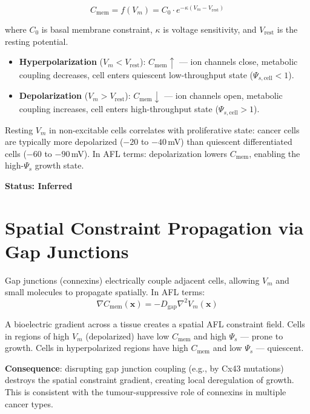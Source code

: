 \documentclass[12pt,a4paper]{article}
\begin{document}
\begin{equation}
    C_{\mathrm{mem}} = f(V_m) = C_0 \cdot e^{-\kappa (V_m - V_{\mathrm{rest}})}
\end{equation}

where $C_0$ is basal membrane constraint, $\kappa$ is voltage sensitivity, and $V_{\mathrm{rest}}$ is the resting potential.

\begin{itemize}
    \item \textbf{Hyperpolarization} ($V_m < V_{\mathrm{rest}}$): $C_{\mathrm{mem}} \uparrow$ --- ion channels close, metabolic coupling decreases, cell enters quiescent low-throughput state ($\Psi_{s,\mathrm{cell}} < 1$).
    \item \textbf{Depolarization} ($V_m > V_{\mathrm{rest}}$): $C_{\mathrm{mem}} \downarrow$ --- ion channels open, metabolic coupling increases, cell enters high-throughput state ($\Psi_{s,\mathrm{cell}} > 1$).
\end{itemize}

Resting $V_m$ in non-excitable cells correlates with proliferative state: cancer cells are typically more depolarized ($-20$ to $-40$\,mV) than quiescent differentiated cells ($-60$ to $-90$\,mV). In AFL terms: depolarization lowers $C_{\mathrm{mem}}$, enabling the high-$\Psi_s$ growth state.

\textbf{Status: Inferred}

\section{Spatial Constraint Propagation via Gap Junctions}

Gap junctions (connexins) electrically couple adjacent cells, allowing $V_m$ and small molecules to propagate spatially. In AFL terms:
\begin{equation}
    \nabla C_{\mathrm{mem}}(\mathbf{x}) = -D_{\mathrm{gap}} \nabla^2 V_m(\mathbf{x})
\end{equation}

A bioelectric gradient across a tissue creates a spatial AFL constraint field. Cells in regions of high $V_m$ (depolarized) have low $C_{\mathrm{mem}}$ and high $\Psi_s$ --- prone to growth. Cells in hyperpolarized regions have high $C_{\mathrm{mem}}$ and low $\Psi_s$ --- quiescent.

\textbf{Consequence}: disrupting gap junction coupling (e.g., by Cx43 mutations) destroys the spatial constraint gradient, creating local deregulation of growth. This is consistent with the tumour-suppressive role of connexins in multiple cancer types.
\end{document}
